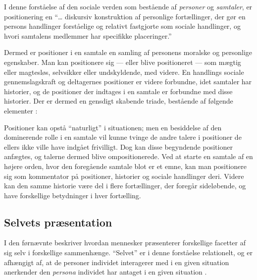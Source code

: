 I denne forståelse af den sociale verden som bestående af 
\emph{personer} og \emph{samtaler}, er positionering en “\ldots 
diskursiv konstruktion af personlige fortællinger, der gør en 
persons handlinger forståelige og relativt fastgjorte som sociale 
handlinger, og hvori samtalens medlemmer har specifikke 
placeringer.” \autocite[s. 16]{harrePositioningTheoryMoral1999}

Dermed er positioner i en samtale en samling af personens moralske
og personlige egenskaber. Man kan positionere sig — eller blive 
positioneret — som mægtig eller magtesløs, selvsikker eller 
undskyldende, med videre. En handlings sociale gennemslagskraft og
deltagernes positioner er videre forbundne, idet samtaler har 
historier, og de positioner der indtages i en samtale er forbundne
med disse historier. Der er dermed en gensdigt skabende triade, 
bestående af følgende elementer \autocite[s.  
17-18]{harrePositioningTheoryMoral1999}:



Positioner kan opstå “naturligt” i situationen; men en besiddelse 
af den dominerende rolle i en samtale vil kunne tvinge de andre 
talere i positioner de ellers ikke ville have indgået frivilligt. 
Dog kan disse begyndende positioner anfægtes, og talerne dermed 
blive ompositionerede. Ved at starte en samtale af en højere 
orden, hvor den foregående samtale blot er et emne, kan man 
positionere sig som kommentator på positioner, historier og 
sociale handlinger deri. Videre kan den samme historie være del i
flere fortællinger, der foregår sideløbende, og have forskellige 
betydninger i hver fortælling.

\subsection{Selvets præsentation}

I den førnævnte  
beskriver \citeauthor{goffmanPresentationSelfEveryday1956} hvordan 
mennesker præsenterer forskellige facetter af sig selv i 
forskellige sammenhænge. “Selvet” er i denne forståelse 
relationelt, og er afhængigt af, at de personer individet 
interagerer med i en given situation anerkender den \emph{persona} 
individet har antaget i en given situation \autocite[s.  
???]{goffmanPresentationSelfEveryday1956}.

